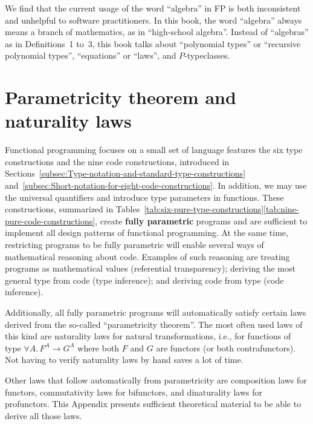 We find that the current usage of the word \textsf{``}algebra\textsf{''} in FP is
both inconsistent and unhelpful to software practitioners. In this
book, the word \textsf{``}algebra\textsf{''} always means a branch of mathematics,
as in \textsf{``}high-school algebra\textsf{''}. Instead of \textsf{``}algebras\textsf{''} as in Definitions~1
to~3, this book talks about \textsf{``}polynomial types\textsf{''} or \textsf{``}recursive
polynomial types\textsf{''}, \textsf{``}equations\textsf{''} or \textsf{``}laws\textsf{''}, and $P$-typeclasses.

\chapter{Parametricity theorem and naturality laws\label{app:Proofs-of-naturality-parametricity}}

Functional programming focuses on a small set of language features
\textemdash{} the six type constructions and the nine code constructions,
introduced in Sections~\ref{subsec:Type-notation-and-standard-type-constructions}
and~\ref{subsec:Short-notation-for-eight-code-constructions}. In
addition, we may use the universal quantifiers and introduce type
parameters in functions. These constructions, summarized in Tables~\ref{tab:six-pure-type-constructions}\textendash \ref{tab:nine-pure-code-constructions},
create \textbf{fully parametric} programs
and are sufficient to implement all design patterns of functional
programming. At the same time, restricting programs to be fully parametric
will enable several ways of mathematical reasoning about code. Examples
of such reasoning are treating programs as mathematical values (referential
transparency); deriving the most
general type from code (type inference); and
deriving code from type (code inference).

Additionally, all fully parametric programs will automatically satisfy
certain laws derived from the so-called \textsf{``}parametricity theorem\textsf{''}.
The most often used laws of this kind are naturality laws for natural
transformations, i.e., for functions of type $\forall A.\,F^{A}\rightarrow G^{A}$
where both $F$ and $G$ are functors (or both contrafunctors). Not
having to verify naturality laws by hand saves a lot of time.

Other laws that follow automatically from parametricity are composition
laws for functors, commutativity laws for bifunctors, and dinaturality
laws for profunctors. This Appendix presents sufficient theoretical
material to be able to derive all those laws. 

